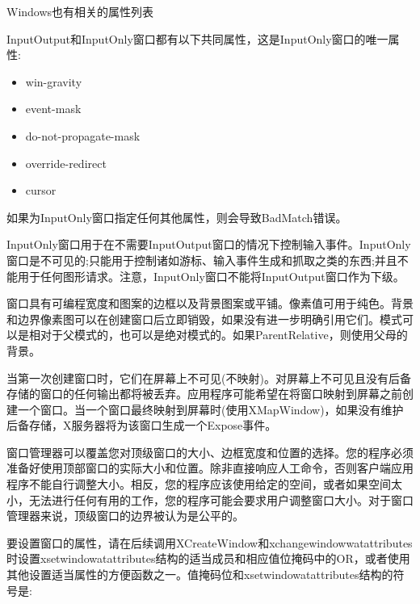 \noindent Windows也有相关的属性列表

\noindent InputOutput和InputOnly窗口都有以下共同属性，这是InputOnly窗口的唯一属性:

\begin{itemize}
	\item win-gravity
	\item event-mask
	\item do-not-propagate-mask
	\item override-redirect
	\item cursor
\end{itemize}

如果为InputOnly窗口指定任何其他属性，则会导致BadMatch错误。

InputOnly窗口用于在不需要InputOutput窗口的情况下控制输入事件。InputOnly窗口是不可见的;只能用于控制诸如游标、输入事件生成和抓取之类的东西;并且不能用于任何图形请求。注意，InputOnly窗口不能将InputOutput窗口作为下级。

窗口具有可编程宽度和图案的边框以及背景图案或平铺。像素值可用于纯色。背景和边界像素图可以在创建窗口后立即销毁，如果没有进一步明确引用它们。模式可以是相对于父模式的，也可以是绝对模式的。如果ParentRelative，则使用父母的背景。

当第一次创建窗口时，它们在屏幕上不可见(不映射)。对屏幕上不可见且没有后备存储的窗口的任何输出都将被丢弃。应用程序可能希望在将窗口映射到屏幕之前创建一个窗口。当一个窗口最终映射到屏幕时(使用XMapWindow)，如果没有维护后备存储，X服务器将为该窗口生成一个Expose事件。

窗口管理器可以覆盖您对顶级窗口的大小、边框宽度和位置的选择。您的程序必须准备好使用顶部窗口的实际大小和位置。除非直接响应人工命令，否则客户端应用程序不能自行调整大小。相反，您的程序应该使用给定的空间，或者如果空间太小，无法进行任何有用的工作，您的程序可能会要求用户调整窗口大小。对于窗口管理器来说，顶级窗口的边界被认为是公平的。

要设置窗口的属性，请在后续调用XCreateWindow和xchangewindowwatattributes时设置xsetwindowatattributes结构的适当成员和相应值位掩码中的OR，或者使用其他设置适当属性的方便函数之一。值掩码位和xsetwindowatattributes结构的符号是:

